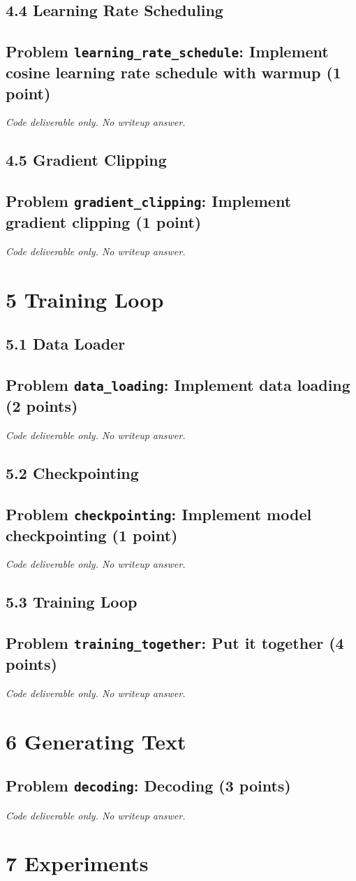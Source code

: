 \documentclass[11pt]{article}
\newcommand{\CodeOnly}{\par\emph{Code deliverable only. No writeup answer.}\par}
\newcommand{\problem}[2]{%
  \subsection*{Problem \texttt{#1}: #2}%
}
\begin{document}
\subsection*{4.4 Learning Rate Scheduling}

\problem{learning\_rate\_schedule}{Implement cosine learning rate schedule with warmup (1 point)}

\CodeOnly

\subsection*{4.5 Gradient Clipping}

\problem{gradient\_clipping}{Implement gradient clipping (1 point)}

\CodeOnly

\section*{5 Training Loop}

\subsection*{5.1 Data Loader}

\problem{data\_loading}{Implement data loading (2 points)}

\CodeOnly

\subsection*{5.2 Checkpointing}

\problem{checkpointing}{Implement model checkpointing (1 point)}

\CodeOnly

\subsection*{5.3 Training Loop}

\problem{training\_together}{Put it together (4 points)}

\CodeOnly

\section*{6 Generating Text}

\problem{decoding}{Decoding (3 points)}

\CodeOnly

\section*{7 Experiments}
\end{document}
